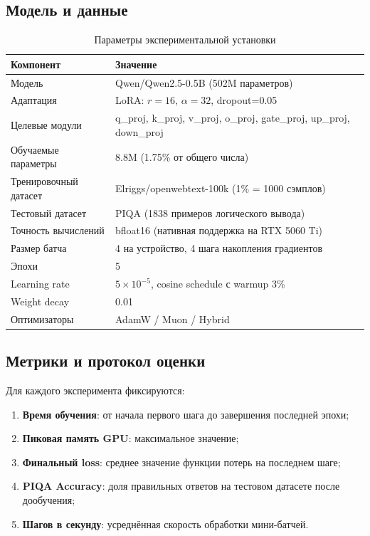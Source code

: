 \documentclass[a4paper,12pt]{article}
\begin{document}
\subsection{Модель и данные}

\begin{table}[H]
\centering
\caption{Параметры экспериментальной установки}
\label{tab:setup}
\begin{tabular}{ll}
\toprule
\textbf{Компонент} & \textbf{Значение} \\
\midrule
Модель & Qwen/Qwen2.5-0.5B (502M параметров) \\
Адаптация & LoRA: $r=16$, $\alpha=32$, dropout=0.05 \\
Целевые модули & q\_proj, k\_proj, v\_proj, o\_proj, gate\_proj, up\_proj, down\_proj \\
Обучаемые параметры & 8.8M (1.75\% от общего числа) \\
Тренировочный датасет & Elriggs/openwebtext-100k (1\% = 1000 сэмплов) \\
Тестовый датасет & PIQA (1838 примеров логического вывода) \\
Точность вычислений & bfloat16 (нативная поддержка на RTX 5060 Ti) \\
Размер батча & 4 на устройство, 4 шага накопления градиентов \\
Эпохи & 5 \\
Learning rate & $5 \times 10^{-5}$, cosine schedule с warmup 3\% \\
Weight decay & 0.01 \\
Оптимизаторы & AdamW / Muon / Hybrid \\
\bottomrule
\end{tabular}
\end{table}

\subsection{Метрики и протокол оценки}

Для каждого эксперимента фиксируются:
\begin{enumerate}
    \item \textbf{Время обучения}: от начала первого шага до завершения последней эпохи;
    \item \textbf{Пиковая память GPU}: максимальное значение;
    \item \textbf{Финальный loss}: среднее значение функции потерь на последнем шаге;
    \item \textbf{PIQA Accuracy}: доля правильных ответов на тестовом датасете после дообучения;
    \item \textbf{Шагов в секунду}: усреднённая скорость обработки мини-батчей.
\end{enumerate}
\end{document}
